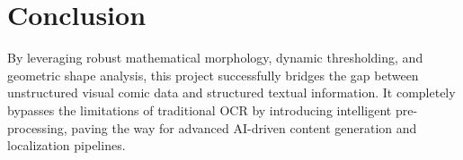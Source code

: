 \documentclass{article}
\begin{document}
\section{Conclusion}
By leveraging robust mathematical morphology, dynamic thresholding, and geometric shape analysis, this project successfully bridges the gap between unstructured visual comic data and structured textual information. It completely bypasses the limitations of traditional OCR by introducing intelligent pre-processing, paving the way for advanced AI-driven content generation and localization pipelines.
\end{document}
